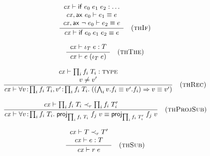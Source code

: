 \[
\frac{\begin{array}{c}\mathit{cx}\vdash\mathsf{if}\;e_0\;e_1\;e_2:\ldots\\\mathit{cx},\mathsf{ax}\ e_0\vdash e_1\equiv e\\\mathit{cx},\mathsf{ax}\ \neg\;e_0\vdash e_2\equiv e\end{array}}{\mathit{cx}\vdash\mathsf{if}\;e_0\;e_1\;e_2\equiv e}\quad\mbox{(\textsc{thIf})}
\]

\[
\frac{\begin{array}{c}\mathit{cx}\vdash\iota_{T}\;e:T\end{array}}{\mathit{cx}\vdash e\;(\iota_{T}\;e)}\quad\mbox{(\textsc{thThe})}
\]

\[
\frac{\begin{array}{c}\mathit{cx}\vdash\prod_{i}f_i\;T_i:\textsc{type}\\v\neq v'\end{array}}{\mathit{cx}\vdash\forall v\!:\!\prod_{i}f_i\;T_i,v'\!:\!\prod_{i}f_i\;T_i.\;((\bigwedge_{i}v.f_i\equiv v'.f_i)\Rightarrow v\equiv v')}\quad\mbox{(\textsc{thRec})}
\]

\[
\frac{\begin{array}{c}\mathit{cx}\vdash\prod_{i}f_i\;T_i\prec_{r}\prod_{i}f_i\;T_i'\end{array}}{\mathit{cx}\vdash\forall v\!:\!\prod_{i}f_i\;T_i.\;\mathsf{proj}_{\prod_{i}f_i\;T_i}\;{f_j}\;v\equiv\mathsf{proj}_{\prod_{i}f_i\;T_i'}\;{f_j}\;v}\quad\mbox{(\textsc{thProjSub})}
\]

\[
\frac{\begin{array}{c}\mathit{cx}\vdash T\prec_{r}T'\\\mathit{cx}\vdash e:T\end{array}}{\mathit{cx}\vdash r\;e}\quad\mbox{(\textsc{thSub})}
\]

